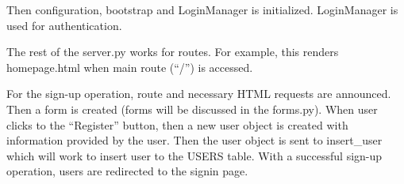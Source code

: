 \documentclass[letterpaper,10pt,english]{sphinxmanual}
\begin{document}
Then configuration, bootstrap and LoginManager is initialized. LoginManager is used for authentication.
\begin{quote}

\begin{sphinxVerbatim}[commandchars=\\\{\}]
  

  
\end{sphinxVerbatim}
\end{quote}

The rest of the server.py works for routes.
For example, this renders homepage.html when main route (“/”) is accessed.

\begin{sphinxVerbatim}[commandchars=\\\{\}]
 
     
\end{sphinxVerbatim}

For the sign-up operation, route and necessary HTML requests are announced. Then a form is created
(forms will be discussed in the forms.py). When user clicks to the “Register” button, then a new
user object is created with information provided by the user.
Then the user object is sent to insert\_user which will work to insert user to the USERS table.
With a successful sign-up operation, users are redirected to the signin page.
\end{document}
